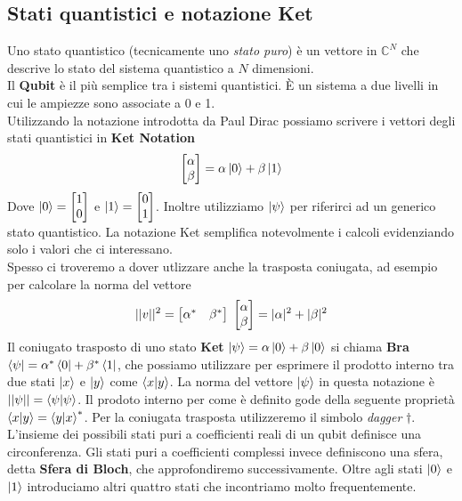 \documentclass{article}
\begin{document}
    \subsection{Stati quantistici e notazione Ket}
    Uno stato quantistico (tecnicamente uno \textit{stato puro}) è un vettore in $\mathbb{C}^N$ che descrive lo stato del sistema quantistico a $N$ dimensioni.
    \\Il \textbf{Qubit} è il più semplice tra i sistemi quantistici. È un sistema a due livelli in cui le ampiezze  sono associate a 0 e 1.
    \\Utilizzando la notazione introdotta da Paul Dirac possiamo scrivere i vettori degli stati quantistici in \textbf{Ket Notation}
    $$
        \begin{bmatrix}
            \alpha \\ \beta
        \end{bmatrix}
        = \alpha \ket{0} + \beta \ket{1}
    $$
    Dove $\ket{0} = \begin{bmatrix} 1\\0\end{bmatrix}$ e $\ket{1} = \begin{bmatrix} 0\\1\end{bmatrix}$. Inoltre utilizziamo $\ket{\psi}$ per riferirci ad un generico stato quantistico. La notazione Ket semplifica notevolmente i calcoli evidenziando solo i valori che ci interessano.
    \\Spesso ci troveremo a dover utlizzare anche la trasposta coniugata, ad esempio per calcolare la norma del vettore
    $$||v||^2 = \begin{bmatrix}
        \alpha^* & \beta^*
    \end{bmatrix}
    \hspace{0.1cm}
    \begin{bmatrix}
        \alpha \\ \beta
    \end{bmatrix}
    = |\alpha|^2 + |\beta|^2 
    $$
    Il coniugato trasposto di uno stato \textbf{Ket} $\ket{\psi} = \alpha\ket{0}+\beta\ket{0}$ si chiama \textbf{Bra} $\bra{\psi} = \alpha^*\bra{0}+\beta^*\bra{1}$, che possiamo utilizzare per esprimere il prodotto interno tra due stati $\ket{x}$ e $\ket{y}$ come $\braket{x|y}$. La norma del vettore $\ket{\psi}$ in questa notazione è
    $||\psi|| = \braket{\psi|\psi}$. Il prodoto interno per come è definito gode della seguente proprietà $\braket{x|y} = \braket{{y|x}}^*$. Per la coniugata trasposta utilizzeremo il simbolo \textit{dagger} $\dagger$.
    \\
    L'insieme dei possibili stati puri a coefficienti reali di un qubit definisce una circonferenza. Gli stati puri a coefficienti complessi invece definiscono una sfera, detta \textbf{Sfera di Bloch}, che approfondiremo successivamente. Oltre agli stati $\ket{0}$ e $\ket{1}$ introduciamo altri quattro stati che incontriamo molto frequentemente.
\end{document}
